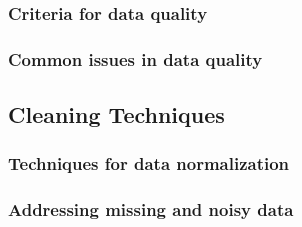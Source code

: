 \subsubsection{Criteria for data quality}
\subsubsection{Common issues in data quality}

\subsection{Cleaning Techniques}
\subsubsection{Techniques for data normalization}
\subsubsection{Addressing missing and noisy data}
